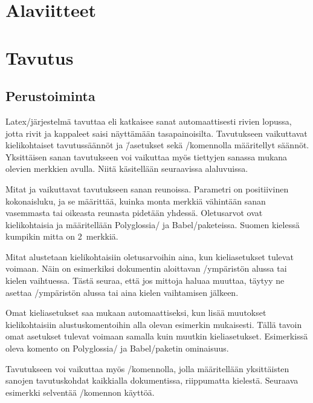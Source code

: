 \section{Alaviitteet}
\section{Tavutus}
\label{luku:tavutus}

\subsection{Perustoiminta}

Latex\-/järjestelmä tavuttaa eli katkaisee sanat automaattisesti rivien
lopussa, jotta rivit ja kappaleet saisi näyttämään tasapainoisilta.
Tavutukseen vaikuttavat kielikohtaiset tavutussäännöt ja \=/asetukset
sekä \-/komennolla määritellyt säännöt.
Yksittäisen sanan tavutukseen voi vaikuttaa myös tiettyjen sanassa
mukana olevien merkkien avulla. Niitä käsitellään seuraavissa
alaluvuissa.

Mitat  ja 
vaikuttavat tavutukseen sanan reunoissa. Parametri  on
positiivinen kokonaisluku, ja se määrittää, kuinka monta merkkiä
vähintään sanan vasemmasta tai oikeasta reunasta pidetään yhdessä.
Oletus\-arvot ovat kielikohtaisia ja määritellään Polyglossia\-/{} ja
Babel\-/paketeissa. Suomen kielessä kumpikin mitta on 2~merkkiä.

Mitat alustetaan kielikohtaisiin oletus\-arvoihin aina, kun
kie\-li\-ase\-tuk\-set tulevat voimaan. Näin on esimerkiksi dokumentin
aloittavan \-/ympäristön alussa tai kielen vaihtuessa.
Tästä seuraa, että jos mittoja ha\-luaa muuttaa, täytyy ne asettaa
\-/ympäristön alussa tai aina kielen vaihtamisen
jälkeen.

Omat kieli\-asetukset saa mukaan automaattiseksi, kun lisää muutokset
kielikohtaisiin alustuskomentoihin alla olevan esimerkin mukaisesti.
Tällä tavoin omat asetukset tulevat voimaan samalla kuin muutkin
kie\-li\-ase\-tuk\-set. Esimerkissä oleva komento 
on Polyglossia\-/{} ja Babel\-/paketin ominaisuus.

\begin{koodilohkosis}
\end{koodilohkosis}

Tavutukseen voi vaikuttaa myös \-/komennolla,
jolla määritellään yksittäisten sanojen tavutuskohdat kaikkialla
dokumentissa, riippumatta kielestä. Seuraava esimerkki selventää
\-/komennon käyttöä.

